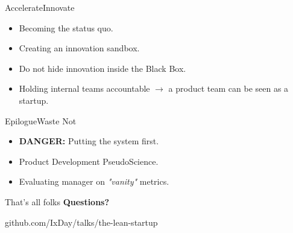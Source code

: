 \documentclass[aspectratio=169]{beamer}
\begin{document}

\begin{frame}{Accelerate}{Innovate}
  \begin{itemize}
    \item Becoming the status quo.
    \item Creating an innovation sandbox.
    \item Do not hide innovation inside the Black Box.
    \item Holding internal teams accountable $\rightarrow$ a product team can be
      seen as a startup.
  \end{itemize}
\end{frame}

\begin{frame}{Epilogue}{Waste Not}
  \begin{itemize}
    \item \textbf{DANGER:} Putting the system first.
    \item Product Development PseudoScience.
    \item Evaluating manager on \textit{"vanity"} metrics.
  \end{itemize}
\end{frame}

\begin{frame}{That's all folks}
  \LARGE \textbf{Questions?}

  \begin{flushright}
    \normalsize github.com/\color{Green}IxDay\color{Grey}/talks/the-lean-startup
   \end{flushright}
\end{frame}
\end{document}
